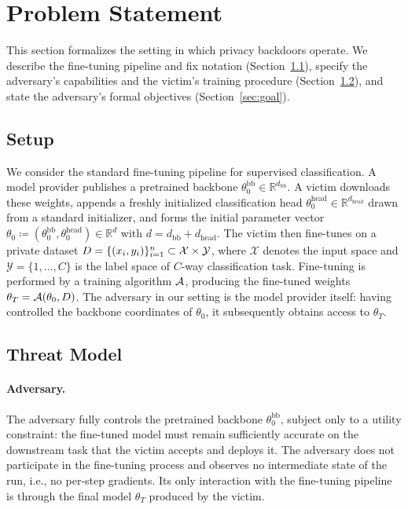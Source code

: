 \section{Problem Statement}
\label{sec:problem}

This section formalizes the setting in which privacy backdoors operate. We describe the fine-tuning pipeline and fix notation (Section~\ref{sec:setup}), specify the adversary's capabilities and the victim's training procedure (Section~\ref{sec:threat}), and state the adversary's formal objectives (Section~\ref{sec:goal}).

\subsection{Setup}
\label{sec:setup}

We consider the standard fine-tuning pipeline for supervised classification. A model provider publishes a pretrained backbone $\theta_0^{\mathrm{bb}} \in \mathbb{R}^{d_{\mathrm{bb}}}$. A victim downloads these weights, appends a freshly initialized classification head $\theta_0^{\mathrm{head}} \in \mathbb{R}^{d_{\mathrm{head}}}$ drawn from a standard initializer, and forms the initial parameter vector $\theta_0 \coloneqq (\theta_0^{\mathrm{bb}}, \theta_0^{\mathrm{head}}) \in \mathbb{R}^d$ with $d = d_{\mathrm{bb}} + d_{\mathrm{head}}$. The victim then fine-tunes on a private dataset $D = \{(x_i, y_i)\}_{i=1}^{n} \subset \mathcal{X} \times \mathcal{Y}$, where $\mathcal{X}$ denotes the input space and $\mathcal{Y} = \{1, \ldots, C\}$ is the label space of $C$-way classification task. Fine-tuning is performed by a training algorithm $\mathcal{A}$, producing the fine-tuned weights $\theta_T = \mathcal{A}(\theta_0, D)$. The adversary in our setting is the model provider itself: having controlled the backbone coordinates of $\theta_0$, it subsequently obtains access to $\theta_T$.

\subsection{Threat Model}
\label{sec:threat}

\paragraph{Adversary.} The adversary fully controls the pretrained backbone $\theta_0^{\mathrm{bb}}$, subject only to a utility constraint: the fine-tuned model must remain sufficiently accurate on the downstream task that the victim accepts and deploys it. The adversary does not participate in the fine-tuning process and observes no intermediate state of the run, i.e., no per-step gradients. Its only interaction with the fine-tuning pipeline is through the final model $\theta_T$ produced by the victim.


